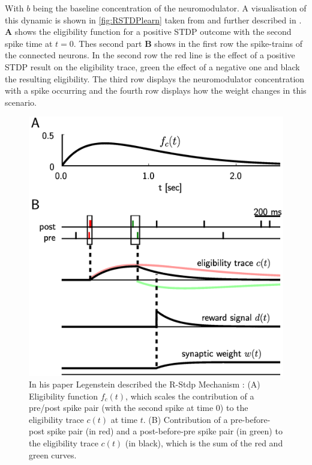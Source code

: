 With $b$ being the baseline concentration of the neuromodulator. A visualisation of this dynamic is shown in \autoref{fig:RSTDPlearn} taken from and further described in \cite{legenstein2008learning}.  \textbf{A} shows the eligibility function for a positive STDP outcome with the second spike time at $t = 0$. Thes second part \textbf{B} shows in the first row the spike-trains of the connected neurons. In the second row the red line is the effect of a positive STDP result on the eligibility trace, green the effect of a negative one and black the resulting eligibility. The third row displays the neuromodulator concentration with a spike occurring and the fourth row displays how the weight changes in this scenario.


\begin{figure}[htpb]
  \centering
  \includegraphics[scale=3]{figures/rstdp.png}
  \caption{In his paper Legenstein described the R-Stdp Mechanism
  \cite{legenstein2008learning}:\newline
  (A) Eligibility function $f_c(t)$, which scales the contribution of a pre/post spike pair (with the second spike at time 0) to the eligibility trace $c(t)$ at time $t$. (B) Contribution of a pre-before-post spike pair (in red) and a post-before-pre spike pair (in green) to the eligibility trace $c(t)$ (in black), which is the sum of the red and green curves.}
  \label{fig:RSTDPlearn}
\end{figure}

